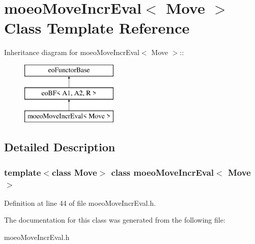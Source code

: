 \section{moeo\-Move\-Incr\-Eval$<$ Move $>$ Class Template Reference}
\label{classmoeoMoveIncrEval}
Inheritance diagram for moeo\-Move\-Incr\-Eval$<$ Move $>$::\begin{figure}[H]
\begin{center}
\leavevmode
\includegraphics[height=3cm]{classmoeoMoveIncrEval}
\end{center}
\end{figure}


\subsection{Detailed Description}
\subsubsection*{template$<$class Move$>$ class moeo\-Move\-Incr\-Eval$<$ Move $>$}





Definition at line 44 of file moeo\-Move\-Incr\-Eval.h.

The documentation for this class was generated from the following file:\begin{CompactItemize}
\item 
moeo\-Move\-Incr\-Eval.h\end{CompactItemize}
